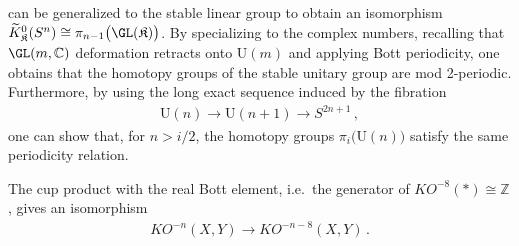    \begin{property}\label{k:homotopy_group_U}
         can be generalized to the stable linear group to obtain an isomorphism $\widetilde{K}^0_{\mathfrak{K}}(S^n)\cong\pi_{n-1}\bigl(\GL(\mathfrak{K})\bigr)$. By specializing to the complex numbers, recalling that $\GL(m,\mathbb{C})$ deformation retracts onto $\mathrm{U}(m)$ and applying Bott periodicity, one obtains that the homotopy groups of the stable unitary group are mod 2-periodic. Furthermore, by using the long exact sequence induced by the fibration
        \begin{gather}
            \mathrm{U}(n)\rightarrow\mathrm{U}(n+1)\rightarrow S^{2n+1}\,,
        \end{gather}
        one can show that, for $n>i/2$, the homotopy groups $\pi_i\bigl(\mathrm{U}(n)\bigr)$ satisfy the same periodicity relation.
    \end{property}

    \begin{theorem}
        The cup product with the real Bott element, i.e.~the generator of $KO^{-8}(\ast)\cong\mathbb{Z}$, gives an isomorphism
        \begin{gather}
            KO^{-n}(X,Y)\rightarrow KO^{-n-8}(X,Y)\,.
        \end{gather}
    \end{theorem}

